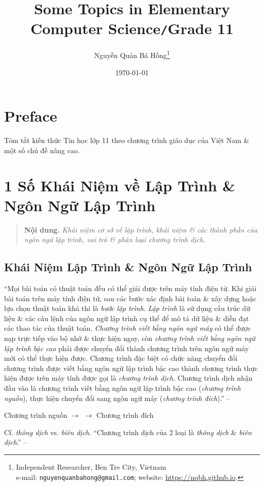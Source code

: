 \documentclass[oneside]{book}
\title{Some Topics in Elementary Computer Science\texttt{/}Grade 11}
\author{Nguyễn Quản Bá Hồng\footnote{Independent Researcher, Ben Tre City, Vietnam\\e-mail: \texttt{nguyenquanbahong@gmail.com}; website: \url{https://nqbh.github.io}.}}
\date{\today}
\numberwithin{equation}{section}
\begin{document}
\frontmatter
\maketitle
\setcounter{secnumdepth}{4}
\setcounter{tocdepth}{3}
\tableofcontents
\newpage


\mainmatter

\chapter*{Preface}

Tóm tắt kiến thức Tin học lớp 11 theo chương trình giáo dục của Việt Nam \& một số chủ đề nâng cao.


\chapter{1 Số Khái Niệm về Lập Trình \& Ngôn Ngữ Lập Trình}

\begin{quotation}
	\textbf{Nội dung.} \textit{Khái niệm cơ sở về lập trình, khái niệm \& các thành phần của ngôn ngữ lập trình, vai trò \& phân loại chương trình dịch}.
\end{quotation}

\section{Khái Niệm Lập Trình \& Ngôn Ngữ Lập Trình}
``Mọi bài toán có thuật toán đều có thể giải được trên máy tính điện tử. Khi giải bài toán trên máy tính điện tử, sau các bước xác định bài toán \& xây dựng hoặc lựa chọn thuật toán khả thi là \textit{bước lập trình}. \textit{Lập trình} là sử dụng cấu trúc dữ liệu \& các câu lệnh của ngôn ngữ lập trình cụ thể để mô tả dữ liệu \& diễn đạt các thao tác của thuật toán. \textit{Chương trình viết bằng ngôn ngữ máy} có thể được nạp trực tiếp vào bộ nhớ \& thực hiện ngay, còn \textit{chương trình viết bằng ngôn ngữ lập trình bậc cao} phải được chuyển đổi thành chương trình trên ngôn ngữ máy mới có thể thực hiện được. Chương trình đặc biệt có chức năng chuyển đổi chương trình được viết bằng ngôn ngữ lập trình bậc cao thành chương trình thực hiện được trên máy tính được gọi là \textit{chương trình dịch}. Chương trình dịch nhận đầu vào là chương trình viết bằng ngôn ngữ lập trình bậc cao (\textit{chương trình nguồn}), thực hiện chuyển đổi sang ngôn ngữ máy (\textit{chương trình đích}).'' -- \cite[p. 4]{SGK_Tin_Hoc_11}
\begin{center}
	Chương trình nguồn $\longrightarrow$  $\longrightarrow$ Chương trình đích
\end{center}
Cf. \textit{thông dịch} vs. \textit{biên dịch}. ``Chương trình dịch của 2 loại là \textit{thông dịch} \& \textit{biên dịch}.'' -- \cite[p. 5]{SGK_Tin_Hoc_11}
\end{document}
